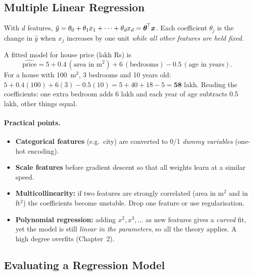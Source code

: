 \subsection{Multiple Linear Regression}

With $d$ features, $\hat y=\theta_0+\theta_1x_1+\cdots+\theta_dx_d=\boldsymbol{\theta}^{\!\top}\boldsymbol{x}$. Each coefficient $\theta_j$ is the change in $\hat y$ when $x_j$ increases by one unit \emph{while all other features are held fixed}.

\begin{example}
A fitted model for house price (lakh Rs) is
\[
\widehat{\text{price}}=5+0.4\,(\text{area in m}^2)+6\,(\text{bedrooms})-0.5\,(\text{age in years}).
\]
For a house with 100~m$^2$, 3 bedrooms and 10 years old: $5+0.4(100)+6(3)-0.5(10)=5+40+18-5=\mathbf{58}$ lakh. Reading the coefficients: one extra bedroom adds 6 lakh and each year of age subtracts 0.5 lakh, other things equal.
\end{example}

\paragraph{Practical points.}
\begin{itemize}
  \item \textbf{Categorical features} (e.g.\ city) are converted to 0/1 \emph{dummy variables} (one-hot encoding).
  \item \textbf{Scale features} before gradient descent so that all weights learn at a similar speed.
  \item \textbf{Multicollinearity:} if two features are strongly correlated (area in m$^2$ and in ft$^2$) the coefficients become unstable. Drop one feature or use regularisation.
  \item \textbf{Polynomial regression:} adding $x^2,x^3,\dots$ as new features gives a \emph{curved} fit, yet the model is still \emph{linear in the parameters}, so all the theory applies. A high degree overfits (Chapter~2).
\end{itemize}

\subsection{Evaluating a Regression Model}

